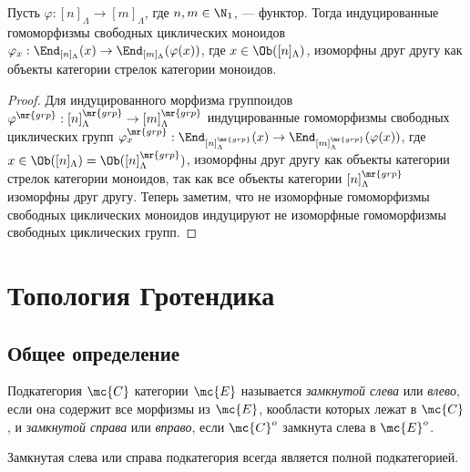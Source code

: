 \documentclass[
	extrafontsizes,
	11pt,
	hyphens,
]{memoir}
\begin{document}
\begin{lemma}%
Пусть \(\varphi : [n]_\Lambda \to [m]_\Lambda\), где \(n, m \in \N_1\), --- функтор.
Тогда индуцированные гомоморфизмы свободных циклических моноидов
\(\varphi_x : \End_{[n]_\Lambda}(x) \to \End_{[m]_\Lambda}(\varphi(x))\),
где \(x \in \Ob([n]_\Lambda)\),
изоморфны друг другу
как объекты категории стрелок категории моноидов.
\end{lemma}

\begin{proof}
Для индуцированного морфизма группоидов
\(\varphi^\mr{grp} : [n]_\Lambda^\mr{grp} \to [m]_\Lambda^\mr{grp}\)
индуцированные гомоморфизмы свободных циклических групп
\(\varphi_x^\mr{grp} : \End_{[n]_\Lambda^\mr{grp}}(x) \to \End_{[m]_\Lambda^\mr{grp}}(\varphi(x))\),
где \(x \in \Ob([n]_\Lambda) = \Ob([n]_\Lambda^\mr{grp})\),
изоморфны друг другу как объекты категории стрелок категории моноидов, так как все объекты категории \([n]_\Lambda^\mr{grp}\) изоморфны друг другу.
Теперь заметим, что не изоморфные гомоморфизмы свободных циклических моноидов индуцируют не изоморфные гомоморфизмы свободных циклических групп.
\end{proof}


\section{Топология Гротендика}

\subsection{Общее определение}

\begin{definition}
Подкатегория \(\mc{C}\) категории \(\mc{E}\) называется \emph{замкнутой слева} или \emph{влево}, если она содержит все морфизмы из \(\mc{E}\), кообласти которых лежат в \(\mc{C}\),
и \emph{замкнутой справа} или \emph{вправо}, если \(\mc{C}^o\) замкнута слева в \(\mc{E}^o\).
\end{definition}


\begin{observation}
Замкнутая слева или справа подкатегория всегда является полной подкатегорией.
\end{observation}
\end{document}
